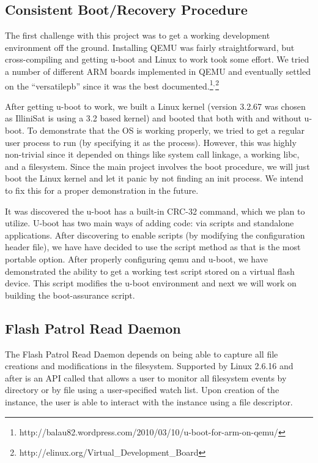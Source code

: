 \subsection{Consistent Boot/Recovery Procedure}
The first challenge with this project was to get a working development
environment off the ground.  Installing QEMU was fairly straightforward, but
cross-compiling and getting u-boot and Linux to work took some effort.  We tried
a number of different ARM boards implemented in QEMU and eventually settled on
the ``versatilepb'' since it was the best documented.\footnote{http://balau82.wordpress.com/2010/03/10/u-boot-for-arm-on-qemu/}$^{,}$\footnote{http://elinux.org/Virtual\_Development\_Board}

After getting u-boot to work, we built a Linux kernel (version 3.2.67 was chosen
as IlliniSat is using a 3.2 based kernel) and booted that both with and without 
u-boot.  To demonstrate that the OS is working properly, we tried to get a
regular user process to run (by specifying it as the  process).
However, this was highly non-trivial since it depended on things like system
call linkage, a working libc, and a filesystem.  Since the main project involves
the boot procedure, we will just boot the Linux kernel and let it panic by not
finding an init process. We intend to fix this for a proper demonstration in the
future.

It was discovered the u-boot has a built-in CRC-32 command, which we plan to
utilize. U-boot has two main ways of adding code: via scripts and standalone
applications.  After discovering to enable scripts (by modifying the
configuration header file), we have have decided to use the script method as
that is the most portable option. After properly configuring qemu and u-boot, we
have demonstrated the ability to get a working test script stored on a virtual
flash device.  This script modifies the u-boot environment and next we will work
on building the boot-assurance script.  


\subsection{Flash Patrol Read Daemon}
The Flash Patrol Read Daemon depends on being able to capture all file creations
and modifications in the filesystem. Supported by Linux 2.6.16 and after is an
API called  that allows a user to monitor all filesystem events by
directory or by file using a user-specified watch list. Upon creation of the
 instance, the user is able to interact with the instance using a
file descriptor. 

